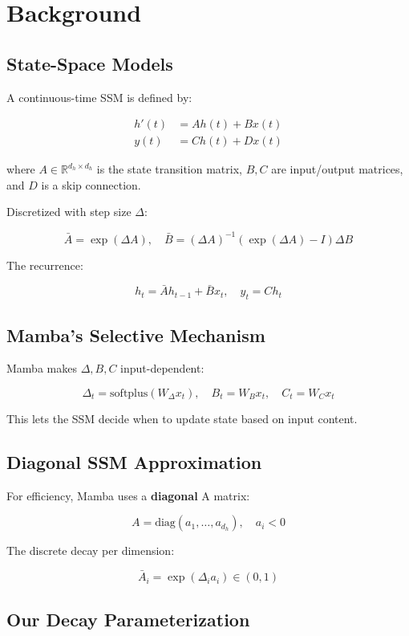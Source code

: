 \section{Background}

\subsection{State-Space Models}

A continuous-time SSM is defined by:

\[
\begin{aligned}
h'(t) &= A h(t) + B x(t) \\
y(t) &= C h(t) + D x(t)
\end{aligned}
\tag{3.1}
\]

where $A \in \mathbb{R}^{d_h \times d_h}$ is the state transition matrix, 
$B, C$ are input/output matrices, and $D$ is a skip connection.

Discretized with step size $\Delta$:

\[
\bar{A} = \exp(\Delta A), \quad \bar{B} = (\Delta A)^{-1} (\exp(\Delta A) - I) \Delta B
\tag{3.2}
\]

The recurrence:

\[
h_t = \bar{A} h_{t-1} + \bar{B} x_t, \quad y_t = C h_t
\tag{3.3}
\]

\subsection{Mamba's Selective Mechanism}

Mamba makes $\Delta, B, C$ input-dependent:

\[
\Delta_t = \text{softplus}(W_\Delta x_t), \quad B_t = W_B x_t, \quad C_t = W_C x_t
\tag{3.4}
\]

This lets the SSM decide when to update state based on input content.

\subsection{Diagonal SSM Approximation}

For efficiency, Mamba uses a \textbf{diagonal} A matrix:

\[
A = \text{diag}(a_1, \dots, a_{d_h}), \quad a_i < 0
\tag{3.5}
\]

The discrete decay per dimension:

\[
\bar{A}_i = \exp(\Delta_i a_i) \in (0, 1)
\tag{3.6}
\]

\subsection{Our Decay Parameterization}

